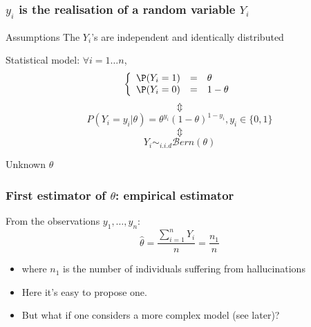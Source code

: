\begin{frame}\frametitle{$y_i$ is the realisation of a random variable $Y_i$}


\begin{block}{Assumptions} 
\noir The $Y_i$'s are independent and identically distributed
\end{block}
\begin{block}{ Statistical model: $\forall i=1\dots n$,}
 $$\left\{ 
\begin{array}{ccl}
\P(Y_i=1) &=& \theta \\
\P(Y_i=0) &=& 1-\theta  
\end{array}
\right. 
$$
$$\Updownarrow$$ $$  P(Y_i=y_i|\theta) = \theta^{y_i} (1-\theta)^{1-y_i} , y_i \in\{0,1\}
$$ 
$$\Updownarrow$$
$$
 Y_{i} \sim_{i.i.d}  \mathcal{B}ern(\theta)  
 $$
\end{block}
\begin{block}{Unknown} \centering \noir $\theta$
\end{block}

 
\end{frame}

\begin{frame}\frametitle{First estimator of $\theta$: empirical estimator}
From the observations $y_1,\dots, y_n$: 
$$ \widehat{\theta} = \frac{\sum_{i=1}^n Y_i}{n} = \frac{n_1}{n}$$
\begin{itemize}
\item where $n_1$ is the number of individuals suffering from hallucinations 
\item \vert Here \noir  it's easy to propose one. 
\item But \vert what if \noir  one considers  a more complex model  (see later)? 
\end{itemize}
\end{frame}

